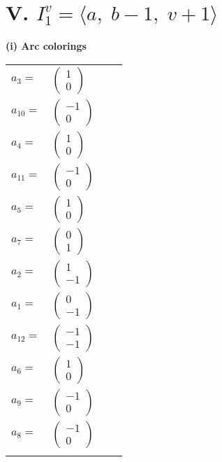 \documentclass[1p]{elsarticle_modified}
\theoremstyle{definition}
\begin{document}
\centering \section*{V. $I^v_{1}= \langle a,\;b-1,\;v+1 \rangle$}
\flushleft \textbf{(i) Arc colorings}\\
\begin{tabular}{m{7pt} m{180pt} m{7pt} m{180pt} }
\flushright $a_{3}=$&$\begin{pmatrix}1\\0\end{pmatrix}$ \\
\flushright $a_{10}=$&$\begin{pmatrix}-1\\0\end{pmatrix}$ \\
\flushright $a_{4}=$&$\begin{pmatrix}1\\0\end{pmatrix}$ \\
\flushright $a_{11}=$&$\begin{pmatrix}-1\\0\end{pmatrix}$ \\
\flushright $a_{5}=$&$\begin{pmatrix}1\\0\end{pmatrix}$ \\
\flushright $a_{7}=$&$\begin{pmatrix}0\\1\end{pmatrix}$ \\
\flushright $a_{2}=$&$\begin{pmatrix}1\\-1\end{pmatrix}$ \\
\flushright $a_{1}=$&$\begin{pmatrix}0\\-1\end{pmatrix}$ \\
\flushright $a_{12}=$&$\begin{pmatrix}-1\\-1\end{pmatrix}$ \\
\flushright $a_{6}=$&$\begin{pmatrix}1\\0\end{pmatrix}$ \\
\flushright $a_{9}=$&$\begin{pmatrix}-1\\0\end{pmatrix}$ \\
\flushright $a_{8}=$&$\begin{pmatrix}-1\\0\end{pmatrix}$\\&\end{tabular}
\end{document}
